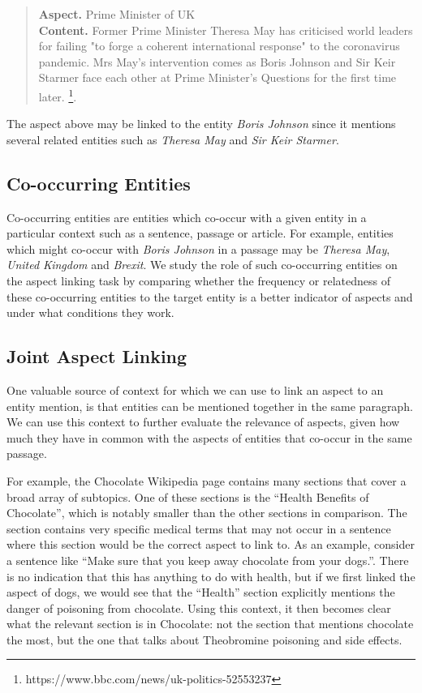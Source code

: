 \begin{quote}
    \textbf{Aspect.} Prime Minister of UK \\
    \textbf{Content.}
    Former Prime Minister Theresa May has criticised world leaders for failing "to forge a coherent international response" to the coronavirus pandemic. Mrs May's intervention comes as Boris Johnson and Sir Keir Starmer face each other at Prime Minister's Questions for the first time later. \footnote{https://www.bbc.com/news/uk-politics-52553237}.
\end{quote}
The aspect above may be linked to the entity \textit{Boris Johnson} since it mentions several related entities such as \textit{Theresa May} and \textit{Sir Keir Starmer}. 

\subsection{Co-occurring Entities}
\label{subsec:Co-occurring Entities}
Co-occurring entities are entities which co-occur with a given entity in a particular context such as a sentence, passage or article. For example, entities which might co-occur with \textit{Boris Johnson} in a passage may be \textit{Theresa May}, \textit{United Kingdom} and \textit{Brexit}. We study the role of such co-occurring entities on the aspect linking task by comparing whether the frequency or relatedness of these co-occurring entities to the target entity is a better indicator of aspects and under what conditions they work. 

\subsection{Joint Aspect Linking}\label{jordan-co-entity}
One valuable source of context for which we can use to link an aspect to an entity mention, is that entities can be mentioned together in the same paragraph.
We can use this context to further evaluate the relevance of aspects, given how much they have in common with the aspects of entities that co-occur in the same passage. 

For example, the Chocolate Wikipedia page contains many sections that cover a broad array of subtopics. One of these sections is the ``Health Benefits of Chocolate'', which is notably smaller than the other sections in comparison. The section contains very specific medical terms that may not occur in a sentence where this section would be the correct aspect to link to. As an example, consider a sentence like ``Make sure that you keep away chocolate from your dogs.''. There is no indication that this has anything to do with health, but if we first linked the aspect of dogs, we would see that the ``Health'' section explicitly mentions the danger of poisoning from chocolate. Using this context, it then becomes clear what the relevant section is in Chocolate: not the section that mentions chocolate the most, but the one that talks about Theobromine poisoning and side effects.

